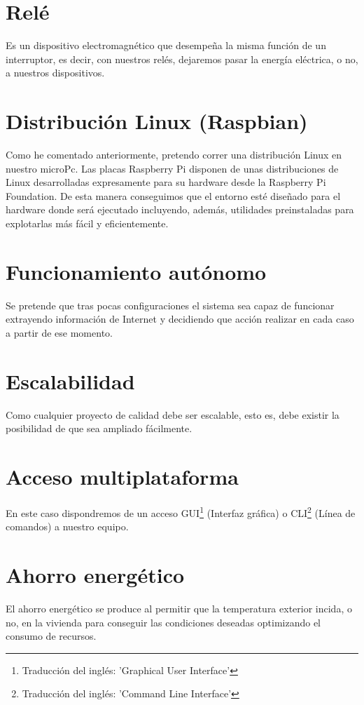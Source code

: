 \section{Relé}
Es un dispositivo electromagnético que desempeña la misma función de un interruptor, es decir, con nuestros relés, dejaremos pasar la energía eléctrica, o no, a nuestros dispositivos.

\section{Distribución Linux (Raspbian)}
Como he comentado anteriormente, pretendo correr una distribución Linux en nuestro microPc. Las placas Raspberry Pi disponen de unas distribuciones de Linux desarrolladas expresamente para su hardware desde la Raspberry Pi Foundation. De esta manera conseguimos que el entorno esté diseñado para el hardware donde será ejecutado incluyendo, además, utilidades preinstaladas para explotarlas más fácil y eficientemente.

\section{Funcionamiento autónomo}
Se pretende que tras pocas configuraciones el sistema sea capaz de funcionar extrayendo información de Internet y decidiendo que acción realizar en cada caso a partir de ese momento.

\section{Escalabilidad}
Como cualquier proyecto de calidad debe ser escalable, esto es, debe existir la posibilidad de que sea ampliado fácilmente.

\section{Acceso multiplataforma}
En este caso dispondremos de un acceso GUI\footnote{Traducción del inglés: 'Graphical User Interface'} (Interfaz gráfica) o CLI\footnote{Traducción del inglés: 'Command Line Interface'} (Línea de comandos) a nuestro equipo.

\section{Ahorro energético}
El ahorro energético se produce al permitir que la temperatura exterior incida, o no, en la vivienda para conseguir las condiciones deseadas optimizando el consumo de recursos.

